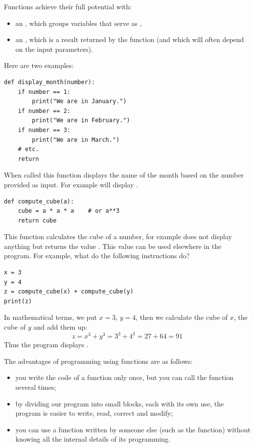 \documentclass[11pt,class=report,crop=false]{standalone}
\begin{document}
\begin{cours}

Functions achieve their full potential with:
\begin{itemize}
  \item an , which groups variables that serve as ,
  \item an , which is a result returned by the function (and which will often depend on the input parameters).
\end{itemize}

Here are two examples:
\begin{center}
\begin{lstlisting}
def display_month(number):
    if number == 1:
        print("We are in January.")
    if number == 2:
        print("We are in February.")
    if number == 3:
        print("We are in March.")
    # etc.
    return
\end{lstlisting}
\end{center}
When called this function displays the name of the month based on the number provided as input. For example  will display .

\begin{center}
\begin{lstlisting}
def compute_cube(a):
    cube = a * a * a    # or a**3
    return cube
\end{lstlisting}

\end{center}

This function calculates the cube of a number, for example  does not display anything but returns the value . This value can be used elsewhere in the program.
For example, what do the following instructions do?
\begin{center}
\begin{lstlisting}
x = 3
y = 4
z = compute_cube(x) + compute_cube(y)
print(z)
\end{lstlisting}
\end{center}
In mathematical terms, we put $x=3$, $y=4$, then we calculate the cube of $x$, the cube of $y$ and add them up:
$$z = x^3 + y^3 = 3^3 + 4^3 = 27 + 64 = 91$$
Thus the program displays .

The advantages of programming using functions are as follows:
\begin{itemize}
  \item you write the code of a function only once, but you can call the function several times;
  \item by dividing our program into small blocks, each with its own use, the program is easier to write, read, correct and modify;
  \item you can use a function written by someone else (such as the  function) without knowing all the internal details of its programming.
\end{itemize} 

\end{cours}
\end{document}
